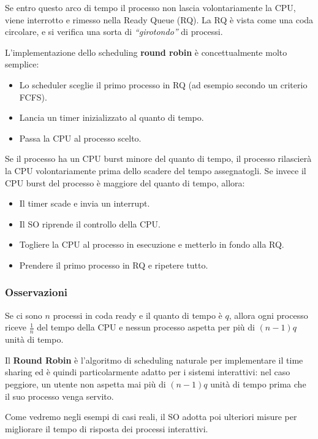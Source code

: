 Se entro questo arco di tempo il processo non lascia volontariamente la CPU, viene interrotto e rimesso nella Ready Queue (RQ). La RQ è vista come una coda circolare, e si verifica una sorta di \textit{“girotondo”} di processi.

L'implementazione dello scheduling \textbf{round robin} è concettualmente molto semplice:
\begin{itemize}
    \item Lo scheduler sceglie il primo processo in RQ (ad esempio secondo un criterio FCFS).
    \item Lancia un timer inizializzato al quanto di tempo.
    \item Passa la CPU al processo scelto.
\end{itemize}

Se il processo ha un CPU burst minore del quanto di tempo, il processo rilascierà la CPU volontariamente prima dello scadere del tempo assegnatogli. Se invece il CPU burst del processo è maggiore del quanto di tempo, allora:
\begin{itemize}
    \item Il timer scade e invia un interrupt.
    \item Il SO riprende il controllo della CPU.
    \item Togliere la CPU al processo in esecuzione e metterlo in fondo alla RQ.
    \item Prendere il primo processo in RQ e ripetere tutto.
\end{itemize}

\subsubsection{Osservazioni}
Se ci sono \( n \) processi in coda ready e il quanto di tempo è \( q \), allora ogni processo riceve \( \frac{1}{n} \) del tempo della CPU e nessun processo aspetta per più di \( (n-1)q \) unità di tempo.

Il \textbf{Round Robin} è l'algoritmo di scheduling naturale per implementare il time sharing ed è quindi particolarmente adatto per i sistemi interattivi: nel caso peggiore, un utente non aspetta mai più di \( (n-1)q \) unità di tempo prima che il suo processo venga servito.

Come vedremo negli esempi di casi reali, il SO adotta poi ulteriori misure per migliorare il tempo di risposta dei processi interattivi.

